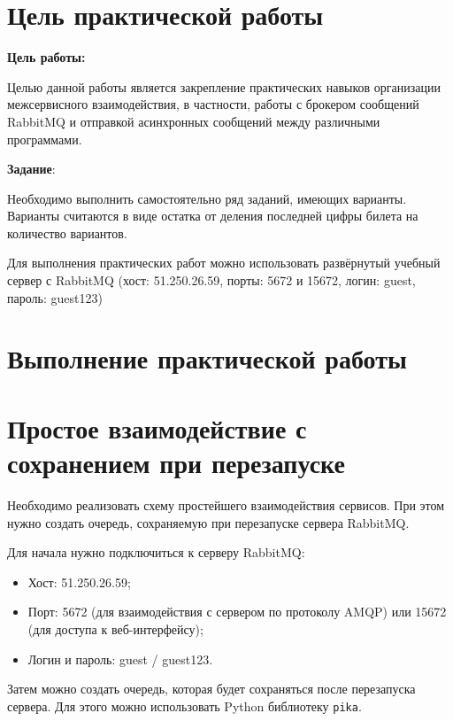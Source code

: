 \section*{\LARGE Цель практической работы}

\textbf{Цель работы:}

Целью данной работы является закрепление практических навыков
организации межсервисного взаимодействия, в частности,
работы с брокером сообщений RabbitMQ
и отправкой асинхронных сообщений между различными программами.

\textbf{Задание}:

Необходимо выполнить самостоятельно ряд заданий, имеющих варианты.
Варианты считаются в виде остатка от деления последней цифры билета
на количество вариантов.

Для выполнения практических работ можно использовать развёрнутый
учебный сервер с RabbitMQ
(хост: 51.250.26.59, порты: 5672 и 15672, логин: guest, пароль: guest123)

\clearpage

\section*{\LARGE Выполнение практической работы}

\section{Простое взаимодействие с сохранением при перезапуске}

Необходимо реализовать схему простейшего взаимодействия сервисов.
При этом нужно создать очередь, сохраняемую при перезапуске сервера RabbitMQ.


Для начала нужно подключиться к серверу RabbitMQ:

\begin{itemize}
	\item Хост: 51.250.26.59;
	\item Порт: 5672 (для взаимодействия с сервером по протоколу AMQP)
		или 15672 (для доступа к веб-интерфейсу);
	\item Логин и пароль: guest / guest123.
\end{itemize}
  
Затем можно создать очередь,
которая будет сохраняться после перезапуска сервера.
Для этого можно использовать Python библиотеку \texttt{pika}.

